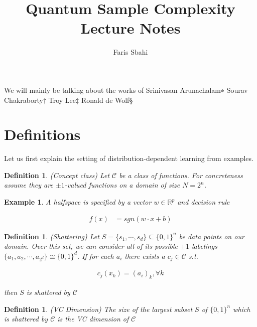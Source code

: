 \documentclass[12]{amsart}
\title{Quantum Sample Complexity Lecture Notes}
\author{Faris Sbahi}
\newcommand\0{\mathbf{0}}
\newcommand\RR{\mathbb{R}}
\newcommand\<{\langle}
\renewcommand\>{\rangle}
\newtheorem{definition}[theorem]{Definition}
\newtheorem{example}[theorem]{Example}
\begin{document}
\maketitle

We will mainly be talking about the works of Srinivasan Arunachalam∗ Sourav Chakraborty† Troy Lee‡ Ronald de Wolf§

\section{Definitions}
Let us first explain the setting of distribution-dependent learning from examples.

\begin{definition}
(Concept class) Let $\mathcal{C}$ be a class of functions. For concreteness assume they are $\pm 1$-valued functions on a domain of size $N= 2^n$.
\end{definition}

\begin{example}
A halfspace is specified by a vector $w \in \RR^p$ and decision rule 

\begin{align*}
f(x) &= sgn(w \cdot x + b)
\end{align*}	
\end{example}

\begin{definition}
(Shattering) Let $S = \{s_1, \cdots, s_d \} \subseteq \{0, 1\}^n$ be data points on our domain. Over this set, we can consider all of its possible $\pm1$ labelings $\{a_1, a_2, \cdots, a_{2^d}\} \cong \{0,1\}^d$. If for each $a_i$ there exists a $c_j \in \mathcal{C}$ s.t. 

\begin{align*}
c_j(x_k) = (a_i)_k, \forall k 
\end{align*}

then $S$ is shattered by $\mathcal{C}$
\end{definition}

\begin{definition}
\label{def:vc-dim}
(VC Dimension) The size of the largest subset $S$ of $\{0, 1\}^n$ which is shattered by $\mathcal{C}$ is the VC dimension of $\mathcal{C}$
\end{definition}
\end{document}
